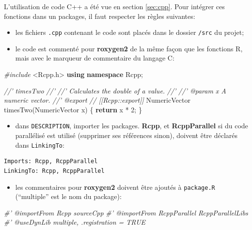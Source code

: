 \documentclass[
  12pt,
  french,
  a4paper,
  extrafontsizes,onecolumn,openright
  ]{memoir}
\newenvironment{Shaded}{\begin{snugshade}}{\end{snugshade}}
\newcommand{\CommentTok}[1]{\textcolor[rgb]{0.56,0.35,0.01}{\textit{#1}}}
\newcommand{\ControlFlowTok}[1]{\textcolor[rgb]{0.13,0.29,0.53}{\textbf{#1}}}
\newcommand{\DecValTok}[1]{\textcolor[rgb]{0.00,0.00,0.81}{#1}}
\newcommand{\ImportTok}[1]{#1}
\newcommand{\KeywordTok}[1]{\textcolor[rgb]{0.13,0.29,0.53}{\textbf{#1}}}
\newcommand{\NormalTok}[1]{#1}
\newcommand{\PreprocessorTok}[1]{\textcolor[rgb]{0.56,0.35,0.01}{\textit{#1}}}
\providecommand{\tightlist}{%
  \setlength{\itemsep}{0pt}\setlength{\parskip}{0pt}}
\begin{document}
L'utilisation de code C++ a été vue en section \ref{sec:cpp}.
Pour intégrer ces fonctions dans un packages, il faut respecter les règles suivantes:

\begin{itemize}
\tightlist
\item
  les fichiers \texttt{.cpp} contenant le code sont placés dans le dossier \texttt{/src} du projet;
\item
  le code est commenté pour \textbf{roxygen2} de la même façon que les fonctions R, mais avec le marqueur de commentaire du langage C:
\end{itemize}

\scriptsize

\begin{Shaded}
\begin{Highlighting}[]
\PreprocessorTok{#include }\ImportTok{<Rcpp.h>}
\KeywordTok{using} \KeywordTok{namespace}\NormalTok{ Rcpp;}

\CommentTok{//' timesTwo}
\CommentTok{//'}
\CommentTok{//' Calculates the double of a value.}
\CommentTok{//'}
\CommentTok{//' @param x A numeric vector.}
\CommentTok{//' @export}
\CommentTok{// [[Rcpp::export]]}
\NormalTok{NumericVector timesTwo(NumericVector x) \{}
  \ControlFlowTok{return}\NormalTok{ x * }\DecValTok{2}\NormalTok{;}
\NormalTok{\}}
\end{Highlighting}
\end{Shaded}

\normalsize

\begin{itemize}
\tightlist
\item
  dans \texttt{DESCRIPTION}, importer les packages.
  \textbf{Rcpp}, et \textbf{RcppParallel} si du code parallélisé est utilisé (supprimer ses références sinon), doivent être déclarés dans \texttt{LinkingTo}:
\end{itemize}

\begin{verbatim}
Imports: Rcpp, RcppParallel
LinkingTo: Rcpp, RcppParallel
\end{verbatim}

\begin{itemize}
\tightlist
\item
  les commentaires pour \textbf{roxygen2} doivent être ajoutés à \texttt{package.R} (\enquote{multiple} est le nom du package):
\end{itemize}

\scriptsize

\begin{Shaded}
\begin{Highlighting}[]
\CommentTok{#' @importFrom Rcpp sourceCpp}
\CommentTok{#' @importFrom RcppParallel RcppParallelLibs}
\CommentTok{#' @useDynLib multiple, .registration = TRUE}
\end{Highlighting}
\end{Shaded}
\end{document}
